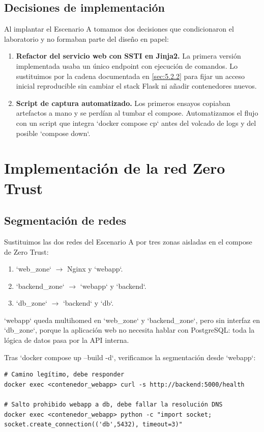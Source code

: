 \documentclass[11pt,spanish,listoffigures,listoftables]{tfgetsinf}
\begin{document}
        \subsection{Decisiones de implementación}
        \label{sec:5.2.3}
        Al implantar el Escenario A tomamos dos decisiones que condicionaron el laboratorio y no formaban parte del diseño en papel:
        \begin{enumerate}
            \item \textbf{Refactor del servicio web con SSTI en Jinja2.} La primera versión implementada usaba un único endpoint con ejecución de comandos. Lo sustituimos por la cadena documentada en \cref{sec:5.2.2} para fijar un acceso inicial reproducible sin cambiar el stack Flask ni añadir contenedores nuevos.
            \item \textbf{Script de captura automatizado.} Los primeros ensayos copiaban artefactos a mano y se perdían al tumbar el compose. Automatizamos el flujo con un script que integra `docker compose cp` antes del volcado de logs y del posible `compose down`.
        \end{enumerate}

    \section{Implementación de la red Zero Trust}
        \subsection{Segmentación de redes}
        Sustituimos las dos redes del Escenario A por tres zonas aisladas en el compose de Zero Trust:
        \begin{enumerate}
            \item `web\_zone` $\rightarrow$ Nginx y `webapp`.
            \item `backend\_zone` $\rightarrow$ `webapp` y `backend`.
            \item `db\_zone` $\rightarrow$ `backend` y `db`.
        \end{enumerate}
        
        `webapp` queda multihomed en `web\_zone` y `backend\_zone`, pero sin interfaz en `db\_zone`, porque la aplicación web no necesita hablar con PostgreSQL: toda la lógica de datos pasa por la API interna.
        
        Tras `docker compose up --build -d`, verificamos la segmentación desde `webapp`:
        \begin{lstlisting}
# Camino legítimo, debe responder
docker exec <contenedor_webapp> curl -s http://backend:5000/health

# Salto prohibido webapp a db, debe fallar la resolución DNS
docker exec <contenedor_webapp> python -c "import socket; socket.create_connection(('db',5432), timeout=3)"
        \end{lstlisting}
        
\end{document}

